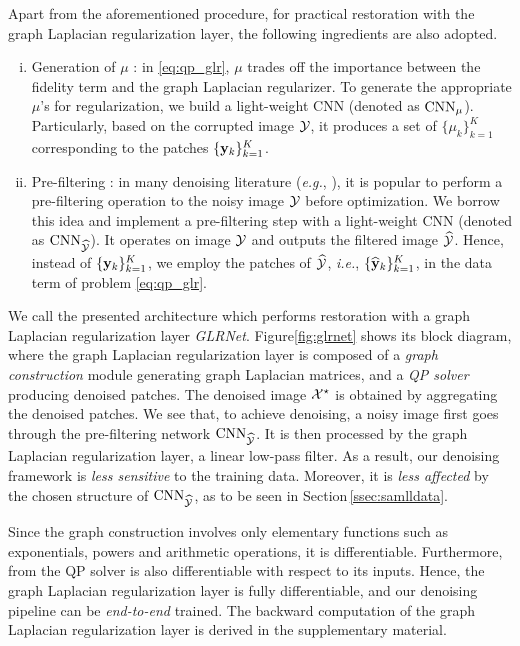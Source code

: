 \documentclass[10pt,twocolumn,letterpaper]{article}
\begin{document}
Apart from the aforementioned procedure, for practical restoration with the graph Laplacian regularization layer, the following ingredients are also adopted.
\begin{enumerate}[(i)]
\item{Generation of $\mu$} : in \eqref{eq:qp_glr}, $\mu$ trades off the importance between the fidelity term and the graph Laplacian regularizer. 
To generate the appropriate $\mu$'s for regularization, we build a light-weight CNN (denoted as $\rm{CNN}_{\mu}$).
Particularly, based on the corrupted image ${\cal Y}$, it produces a set of $\{\mu_k\}_{k=1}^K$ corresponding to the patches $\{{\bf y}_k\}_{k=1}^K$. 
\item{Pre-filtering} : in many denoising literature ({\it e.g.}, \cite{milanfar2013tour,chatterjee2012patch,pang2015optimal}), it is popular to perform a pre-filtering operation to the noisy image ${\cal Y}$ before optimization. 
We borrow this idea and implement a pre-filtering step with a light-weight CNN (denoted as ${\rm CNN}_{\widehat{\cal Y}}$). 
It operates on image ${\cal Y}$ and outputs the filtered image ${\widehat{\cal Y}}$. 
Hence, instead of $\{{\bf y }_k\}_{k=1}^K$, we employ the patches of ${\widehat{\cal Y}}$, {\it i.e.}, $\{\widehat{{\bf y}}_k\}_{k=1}^K$, in the data term of problem \eqref{eq:qp_glr}.
\end{enumerate}

We call the presented architecture which performs restoration with a graph Laplacian regularization layer \emph{GLRNet}.
Figure\;\ref{fig:glrnet} shows its block diagram, where the graph Laplacian regularization layer is composed of a \emph{graph construction} module generating graph Laplacian matrices, and a \emph{QP solver} producing denoised patches. The denoised image ${\cal X}^{\star}$ is obtained by aggregating the denoised patches.
We see that, to achieve denoising, a noisy image first goes through the pre-filtering network ${\rm CNN}_{\widehat{\cal Y}}$. 
It is then processed by the graph Laplacian regularization layer, a linear low-pass filter.
As a result, our denoising framework is {\it less sensitive} to the training data. 
Moreover, it is \emph{less affected} by the chosen structure of ${\rm CNN}_{\widehat{\cal Y}}$, as to be seen in Section\,\ref{ssec:samlldata}.

Since the graph construction involves only elementary functions such as exponentials, powers and arithmetic operations, it is differentiable. 
Furthermore, from \cite{amos2017optnet} the QP solver is also differentiable with respect to its inputs. 
Hence, the graph Laplacian regularization layer is fully differentiable, and our denoising pipeline can be {\it end-to-end} trained. 
The backward computation of the graph Laplacian regularization layer is derived in the supplementary material.
\end{document}
